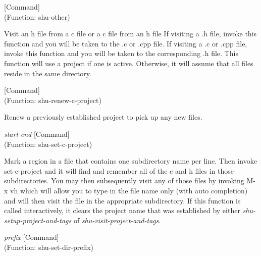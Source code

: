 \vspace{1em}
\noindent
{}
\usebox{\funcname}
 \hfill [Command]\\%
 (Function: shu-other)

\begin{doc-string}
Visit an h file from a c file or a c file from an h file If visiting a .h
file, invoke this function and you will be taken to the .c or .cpp file.  If
visiting a .c or .cpp file, invoke this function and you will be taken to the
corresponding .h file.  This function will use a project if one is active.
Otherwise, it will assume that all files reside in the same directory.
\end{doc-string}

\vspace{1em}
\noindent
{}
\usebox{\funcname}
 \hfill [Command]\\%
 (Function: shu-renew-c-project)

\begin{doc-string}
Renew a previously established project to pick up any new files.
\end{doc-string}

\vspace{1em}
\noindent
{}
\usebox{\funcname}\emph{start} \emph{end}
 \hfill [Command]\\%
 (Function: shu-set-c-project)

\begin{doc-string}
Mark a region in a file that contains one subdirectory name per line.  Then
invoke set-c-project and it will find and remember all of the c and h files in
those subdirectories.  You may then subsequently visit any of those files by
invoking M-x vh which will allow you to type in the file name only (with auto
completion) and will then visit the file in the appropriate subdirectory.  If
this function is called interactively, it clears the project name that was
established by either \emph{shu-setup-project-and-tags} of \emph{shu-visit-project-and-tags}.
\end{doc-string}

\vspace{1em}
\noindent
{}
\usebox{\funcname}\emph{prefix}
 \hfill [Command]\\%
 (Function: shu-set-dir-prefix)

